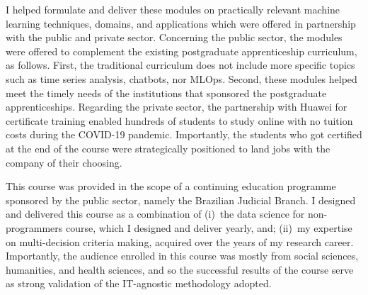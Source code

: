 %
{I helped formulate and deliver these modules on practically relevant machine learning techniques, domains, and applications which were offered in partnership with the public and private sector. Concerning the public sector, the modules were offered to complement the existing postgraduate apprenticeship curriculum, as follows. First, the traditional curriculum does not include more specific topics such as time series analysis, chatbots, nor MLOps. Second, these modules helped meet the timely needs of the institutions that sponsored the postgraduate apprenticeships. Regarding the private sector, the partnership with Huawei for certificate training enabled hundreds of students to study online with no tuition costs during the COVID-19 pandemic. Importantly, the students who got certified at the end of the course were strategically positioned to land jobs with the company of their choosing.}

\cvline{}{\hrule}

%
{This course was provided in the scope of a continuing education programme sponsored by the public sector, namely the Brazilian Judicial Branch. I designed and delivered this course as a combination of (i)~the data science for non-programmers course, which I designed and deliver yearly, and; (ii)~my expertise on multi-decision criteria making, acquired over the years of my research career. Importantly, the audience enrolled in this course was mostly from social sciences, humanities, and health sciences, and so the successful results of the course serve as strong validation of the IT-agnostic methodology adopted.}

